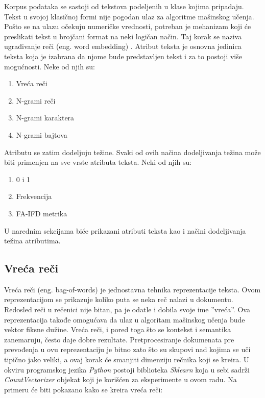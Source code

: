 \documentclass[12pt,oneside]{memoir}
\begin{document}
Korpus podataka se sastoji od tekstova podeljenih u klase kojima pripadaju. Tekst u svojoj klasičnoj formi nije pogodan ulaz za algoritme mašinskog učenja.  Pošto se na ulazu očekuju numeričke vrednosti,  potreban je mehanizam koji će preslikati tekst u brojčani format na neki logičan način.  Taj korak se naziva ugrađivanje reči (eng.  word embedding) \cite{wordembedding}.  Atribut teksta je osnovna jedinica teksta koja je izabrana da njome bude predstavljen tekst i za to postoji više mogućnosti. 
\newpage
Neke od njih su:
\begin{enumerate}
\item Vreća reči
\item N-grami reči
\item N-grami karaktera
\item N-grami bajtova
\end{enumerate}
Atributu se zatim dodeljuju težine.  Svaki od ovih načina dodeljivanja težina može biti primenjen na sve vrste atributa teksta. Neki od njih su:
\begin{enumerate}
\item 0 i 1
\item Frekvencija
\item FA-IFD metrika
\end{enumerate}

U narednim sekcijama biće prikazani atributi teksta kao i načini dodeljivanja težina atributima.

\subsection{Vreća reči}
Vreća reči (eng. bag-of-words) je jednostavna tehnika reprezentacije teksta. Ovom reprezentacijom se prikazuje koliko puta se neka reč nalazi u dokumentu.  Redosled reči u rečenici nije bitan,  pa je odatle i dobila svoje ime ”vreća”.  Ova reprezentacija takođe omogućava da ulaz u algoritam mašinskog učenja bude vektor fiksne dužine. Vreća reči, i pored toga što se kontekst i semantika zanemaruju,  često daje dobre rezultate.  
Pretprocesiranje dokumenata pre prevođenja u ovu reprezentaciju je bitno zato što su skupovi nad kojima se uči tipično jako veliki, a ovaj korak će smanjiti dimenziju rečnika koji se kreira.
U okviru programskog jezika \textit{Python} postoji biblioteka \textit{Sklearn} koja u sebi sadrži \textit{CountVectorizer} objekat koji je korišćen za eksperimente u ovom radu. 
Na primeru će biti pokazano kako se kreira vreća reči:
\end{document}
